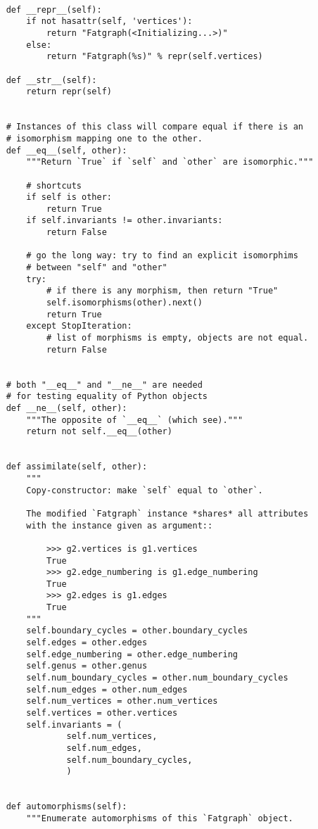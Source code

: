 \begin{lstlisting}

    def __repr__(self):
        if not hasattr(self, 'vertices'):
            return "Fatgraph(<Initializing...>)"
        else:
            return "Fatgraph(%s)" % repr(self.vertices)
    
    def __str__(self):
        return repr(self)


    # Instances of this class will compare equal if there is an
    # isomorphism mapping one to the other.
    def __eq__(self, other):
        """Return `True` if `self` and `other` are isomorphic."""

        # shortcuts
        if self is other:
            return True
        if self.invariants != other.invariants:
            return False

        # go the long way: try to find an explicit isomorphims
        # between "self" and "other"
        try:
            # if there is any morphism, then return "True"
            self.isomorphisms(other).next()
            return True
        except StopIteration:
            # list of morphisms is empty, objects are not equal.
            return False


    # both "__eq__" and "__ne__" are needed 
    # for testing equality of Python objects
    def __ne__(self, other):
        """The opposite of `__eq__` (which see)."""
        return not self.__eq__(other)


    def assimilate(self, other):
        """
        Copy-constructor: make `self` equal to `other`.

        The modified `Fatgraph` instance *shares* all attributes
        with the instance given as argument::

            >>> g2.vertices is g1.vertices
            True
            >>> g2.edge_numbering is g1.edge_numbering
            True
            >>> g2.edges is g1.edges
            True
        """
        self.boundary_cycles = other.boundary_cycles
        self.edges = other.edges
        self.edge_numbering = other.edge_numbering
        self.genus = other.genus
        self.num_boundary_cycles = other.num_boundary_cycles
        self.num_edges = other.num_edges
        self.num_vertices = other.num_vertices
        self.vertices = other.vertices
        self.invariants = (
                self.num_vertices,
                self.num_edges,
                self.num_boundary_cycles,
                )


    def automorphisms(self):
        """Enumerate automorphisms of this `Fatgraph` object.


\end{lstlisting}
